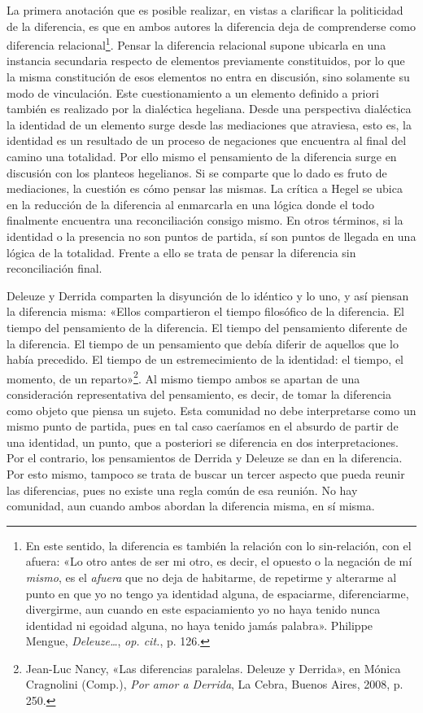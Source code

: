 La primera anotación que es posible realizar, en vistas a clarificar la politicidad de la diferencia, es que en ambos autores la diferencia deja de comprenderse como diferencia relacional\footnote{En este sentido, la diferencia es también la relación con lo sin-relación, con el afuera: «Lo otro antes de ser mi otro, es decir, el opuesto o la negación de mí \emph{mismo}, es el \emph{afuera} que no deja de habitarme, de repetirme y alterarme al punto en que yo no tengo ya identidad alguna, de espaciarme, diferenciarme, divergirme, aun cuando en este espaciamiento yo no haya tenido nunca identidad ni egoidad alguna, no haya tenido jamás palabra». Philippe Mengue, \emph{Deleuze\ldots{}}, \emph{op. cit.}, p. 126.}. Pensar la diferencia relacional supone ubicarla en una instancia secundaria respecto de elementos previamente constituidos, por lo que la misma constitución de esos elementos no entra en discusión, sino solamente su modo de vinculación. Este cuestionamiento a un elemento definido a priori también es realizado por la dialéctica hegeliana. Desde una perspectiva dialéctica la identidad de un elemento surge desde las mediaciones que atraviesa, esto es, la identidad es un resultado de un proceso de negaciones que encuentra al final del camino una totalidad. Por ello mismo el pensamiento de la diferencia surge en discusión con los planteos hegelianos. Si se comparte que lo dado es fruto de mediaciones, la cuestión es cómo pensar las mismas. La crítica a Hegel se ubica en la reducción de la diferencia al enmarcarla en una lógica donde el todo finalmente encuentra una reconciliación consigo mismo. En otros términos, si la identidad o la presencia no son puntos de partida, sí son puntos de llegada en una lógica de la totalidad. Frente a ello se trata de pensar la diferencia sin reconciliación final.

Deleuze y Derrida comparten la disyunción de lo idéntico y lo uno, y así piensan la diferencia misma: «Ellos compartieron el tiempo filosófico de la diferencia. El tiempo del pensamiento de la diferencia. El tiempo del pensamiento diferente de la diferencia. El tiempo de un pensamiento que debía diferir de aquellos que lo había precedido. El tiempo de un estremecimiento de la identidad: el tiempo, el momento, de un reparto»\footnote{Jean-Luc Nancy, «Las diferencias paralelas. Deleuze y Derrida», en Mónica Cragnolini (Comp.), \emph{Por amor a Derrida}, La Cebra, Buenos Aires, 2008, p. 250.}. Al mismo tiempo ambos se apartan de una consideración representativa del pensamiento, es decir, de tomar la diferencia como objeto que piensa un sujeto. Esta comunidad no debe interpretarse como un mismo punto de partida, pues en tal caso caeríamos en el absurdo de partir de una identidad, un punto, que a posteriori se diferencia en dos interpretaciones. Por el contrario, los pensamientos de Derrida y Deleuze se dan en la diferencia. Por esto mismo, tampoco se trata de buscar un tercer aspecto que pueda reunir las diferencias, pues no existe una regla común de esa reunión. No hay comunidad, aun cuando ambos abordan la diferencia misma, en sí misma.

